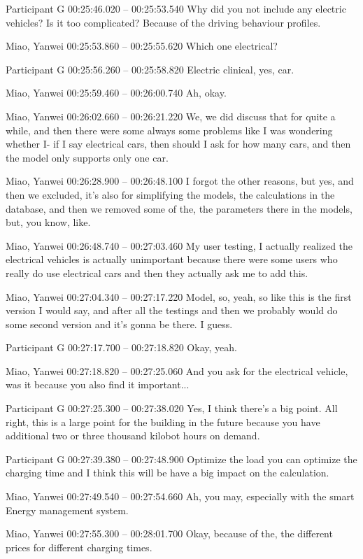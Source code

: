 {Participant G 00:25:46.020 -- 00:25:53.540
Why did you not include any electric vehicles? Is it too complicated? Because of the driving behaviour profiles.

Miao, Yanwei 00:25:53.860 -- 00:25:55.620
Which one electrical?

Participant G 00:25:56.260 -- 00:25:58.820
Electric clinical, yes, car.

Miao, Yanwei 00:25:59.460 -- 00:26:00.740
Ah, okay.

Miao, Yanwei 00:26:02.660 -- 00:26:21.220
We, we did discuss that for quite a while, and then there were some always some problems like I was wondering whether I- if I say electrical cars, then should I ask for how many cars, and then the model only supports only one car.

Miao, Yanwei 00:26:28.900 -- 00:26:48.100
I forgot the other reasons, but yes, and then we excluded, it's also for simplifying the models, the calculations in the database, and then we removed some of the, the parameters there in the models, but, you know, like.

Miao, Yanwei 00:26:48.740 -- 00:27:03.460
My user testing, I actually realized the electrical vehicles is actually unimportant because there were some users who really do use electrical cars and then they actually ask me to add this.

Miao, Yanwei 00:27:04.340 -- 00:27:17.220
Model, so, yeah, so like this is the first version I would say, and after all the testings and then we probably would do some second version and it's gonna be there. I guess.

Participant G 00:27:17.700 -- 00:27:18.820
Okay, yeah.

Miao, Yanwei 00:27:18.820 -- 00:27:25.060
And you ask for the electrical vehicle, was it because you also find it important...

Participant G 00:27:25.300 -- 00:27:38.020
Yes, I think there's a big point. All right, this is a large point for the building in the future because you have additional two or three thousand kilobot hours on demand.

Participant G 00:27:39.380 -- 00:27:48.900
Optimize the load you can optimize the charging time and I think this will be have a big impact on the calculation.

Miao, Yanwei 00:27:49.540 -- 00:27:54.660
Ah, you may, especially with the smart Energy management system.

Miao, Yanwei 00:27:55.300 -- 00:28:01.700
Okay, because of the, the different prices for different charging times.

}
